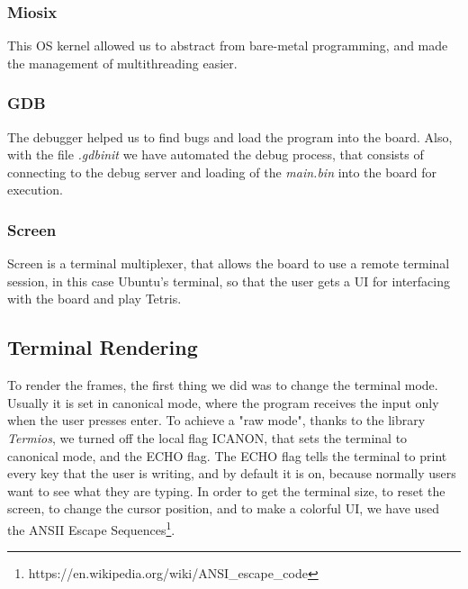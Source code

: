 \documentclass{article}
\begin{document}
\subsubsection{Miosix}
This OS kernel allowed us to abstract from bare-metal programming, and made the management of multithreading easier\cite{slidebaremetal}\cite{osprogramming}.
\subsubsection{GDB}
The debugger helped us to find bugs and load the program into the board. Also, with the file \emph{.gdbinit} we have automated the debug process, that consists of connecting to the debug server and loading of the \emph{main.bin} into the board for execution.
\subsubsection{Screen}
Screen is a terminal multiplexer, that allows the board to use a remote terminal session, in this case Ubuntu's terminal, so that the user gets a UI for interfacing with the board and play Tetris.
 
\subsection{Terminal Rendering}
\label{terminal-rendering}
To render the frames, the first thing we did was to change the terminal mode. Usually it is set in canonical mode, where the program receives the input only when the user presses enter.
To achieve a "raw mode", thanks to the library \textit{Termios}, we turned off the local flag ICANON, that sets the terminal to canonical mode, and the ECHO flag.
The ECHO flag tells the terminal to print every key that the user is writing, and by default it is on, because normally users want to see what they are typing.
In order to get the terminal size, to reset the screen, to change the cursor position, and to make a colorful UI, we have used the ANSII Escape Sequences\footnote{https://en.wikipedia.org/wiki/ANSI\_escape\_code}. 
\end{document}
